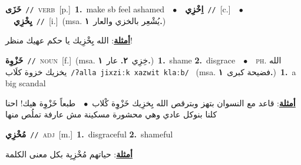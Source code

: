 \documentclass[10pt,a4paper,twoside]{article} %
\begin{document}
\begin{multicols}{2}
{\setlength\topsep{0pt}\textbf{\foreignlanguage{arabic}{خَزَى}}\ {\color{gray}\texttt{//}\color{black}}\ \textsc{verb}\ [p.]\ \textbf{1.}~make sb feel ashamed\ \ $\bullet$\ \ \setlength\topsep{0pt}\textbf{\foreignlanguage{arabic}{اِخْزِي}}\ {\color{gray}\texttt{//}\color{black}}\ [c.]\ \ $\bullet$\ \ \setlength\topsep{0pt}\textbf{\foreignlanguage{arabic}{يِخْزِي}}\ {\color{gray}\texttt{//}\color{black}}\ [i.]\ \color{gray}(msa. \foreignlanguage{arabic}{يُشْعِر بالخزي والعار}~\foreignlanguage{arabic}{\textbf{١.}})\color{black}\  \begin{flushright}\color{gray}\foreignlanguage{arabic}{\textbf{\underline{\foreignlanguage{arabic}{أمثلة}}}: الله يِخْزِيك يا حكم عهيك منظر!}\end{flushright}\color{black}} \vspace{2mm}

{\setlength\topsep{0pt}\textbf{\foreignlanguage{arabic}{خَزْوِة}}\ {\color{gray}\texttt{//}\color{black}}\ \textsc{noun}\ [f.]\ \color{gray}(msa. \foreignlanguage{arabic}{خِزِي}~\foreignlanguage{arabic}{\textbf{٢.}}  \foreignlanguage{arabic}{عار}~\foreignlanguage{arabic}{\textbf{١.}})\color{black}\ \textbf{1.}~shame  \textbf{2.}~disgrace\ \ $\bullet$\ \ \textsc{ph.} \color{gray} \foreignlanguage{arabic}{الله يخزيك خزوة كلَاب}\color{black}\ {\color{gray}\texttt{/{\sffamily ʔalla jixziːk xazwit klaːb}/}\color{black}}\ \color{gray} (msa. \foreignlanguage{arabic}{فضيحة كبرى}~\foreignlanguage{arabic}{\textbf{١.}})\color{black}\ \textbf{1.}~a big scandal\  \begin{flushright}\color{gray}\foreignlanguage{arabic}{\textbf{\underline{\foreignlanguage{arabic}{أمثلة}}}: قاعد مع النسوان بتهز وبترقص الله يِخزِيك خَزْوِِة كْلاب\ $\bullet$\ \  طبعاً خَزْوِة هيك! احنا كلنا بنوكل عادي وهي محشورة مسكينة مش عارفة تملُص منها}\end{flushright}\color{black}} \vspace{2mm}

{\setlength\topsep{0pt}\textbf{\foreignlanguage{arabic}{مُخْزِي}}\ {\color{gray}\texttt{//}\color{black}}\ \textsc{adj}\ [m.]\ \textbf{1.}~disgraceful  \textbf{2.}~shameful\  \begin{flushright}\color{gray}\foreignlanguage{arabic}{\textbf{\underline{\foreignlanguage{arabic}{أمثلة}}}: حياتهم مُخْزِيِة بكل معنى الكلمة}\end{flushright}\color{black}} \vspace{2mm}


\end{multicols}
\end{document}
